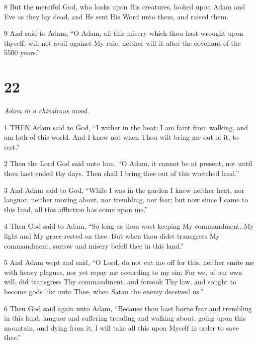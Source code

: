 \par 8 But the merciful God, who looks upon His creatures, looked upon Adam and Eve as they lay dead, and He sent His Word unto them, and raised them.

\par 9 And said to Adam, “O Adam, all this misery which thou hast wrought upon thyself, will not avail against My rule, neither will it alter the covenant of the 5500 years.”

\chapter{22}

\par \textit{Adam in a chivalrous mood.}

\par 1 THEN Adam said to God, “I wither in the heat; I am faint from walking, and am loth of this world. And I know not when Thou wilt bring me out of it, to rest.”

\par 2 Then the Lord God said unto him, “O Adam, it cannot be at present, not until thou hast ended thy days. Then shall I bring thee out of this wretched land.”

\par 3 And Adam said to God, “While I was in the garden I knew neither heat, nor languor, neither moving about, nor trembling, nor fear; but now since I came to this land, all this affliction has come upon me.”

\par 4 Then God said to Adam, “So long as thou wast keeping My commandment, My light and My grace rested on thee. But when thou didst transgress My commandment, sorrow and misery befell thee in this land.”

\par 5 And Adam wept and said, “O Lord, do not cut me off for this, neither smite me with heavy plagues, nor yet repay me according to my sin; For we, of our own will, did transgress Thy commandment, and forsook Thy law, and sought to become gods like unto Thee, when Satan the enemy deceived us.”

\par 6 Then God said again unto Adam, “Because thou hast borne fear and trembling in this land, languor and suffering treading and walking about, going upon this mountain, and dying from it, I will take all this upon Myself in order to save thee.”

